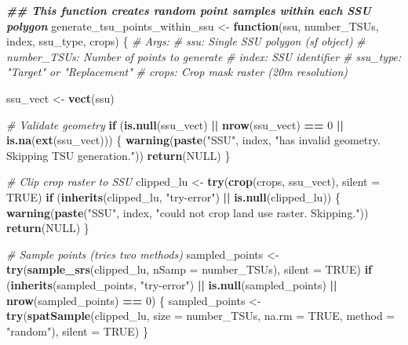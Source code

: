 \documentclass[
  10pt,
  b5paper,
  oneside]{book}
\newenvironment{Shaded}{\begin{snugshade}}{\end{snugshade}}
\newcommand{\AttributeTok}[1]{\textcolor[rgb]{0.13,0.29,0.53}{#1}}
\newcommand{\CommentTok}[1]{\textcolor[rgb]{0.56,0.35,0.01}{\textit{#1}}}
\newcommand{\ConstantTok}[1]{\textcolor[rgb]{0.56,0.35,0.01}{#1}}
\newcommand{\ControlFlowTok}[1]{\textcolor[rgb]{0.13,0.29,0.53}{\textbf{#1}}}
\newcommand{\DecValTok}[1]{\textcolor[rgb]{0.00,0.00,0.81}{#1}}
\newcommand{\DocumentationTok}[1]{\textcolor[rgb]{0.56,0.35,0.01}{\textbf{\textit{#1}}}}
\newcommand{\FunctionTok}[1]{\textcolor[rgb]{0.13,0.29,0.53}{\textbf{#1}}}
\newcommand{\NormalTok}[1]{#1}
\newcommand{\OtherTok}[1]{\textcolor[rgb]{0.56,0.35,0.01}{#1}}
\newcommand{\SpecialCharTok}[1]{\textcolor[rgb]{0.81,0.36,0.00}{\textbf{#1}}}
\newcommand{\StringTok}[1]{\textcolor[rgb]{0.31,0.60,0.02}{#1}}
\begin{document}
\begin{Shaded}
\begin{Highlighting}[]
\DocumentationTok{\#\# This function creates random point samples within each SSU polygon}
\NormalTok{generate\_tsu\_points\_within\_ssu }\OtherTok{\textless{}{-}} \ControlFlowTok{function}\NormalTok{(ssu, number\_TSUs, index, ssu\_type, crops) \{}
  \CommentTok{\# Args:}
  \CommentTok{\#   ssu: Single SSU polygon (sf object)}
  \CommentTok{\#   number\_TSUs: Number of points to generate}
  \CommentTok{\#   index: SSU identifier}
  \CommentTok{\#   ssu\_type: "Target" or "Replacement"}
  \CommentTok{\#   crops: Crop mask raster (20m resolution)}
  
\NormalTok{  ssu\_vect }\OtherTok{\textless{}{-}} \FunctionTok{vect}\NormalTok{(ssu)}
  
  \CommentTok{\# Validate geometry}
  \ControlFlowTok{if}\NormalTok{ (}\FunctionTok{is.null}\NormalTok{(ssu\_vect) }\SpecialCharTok{||} \FunctionTok{nrow}\NormalTok{(ssu\_vect) }\SpecialCharTok{==} \DecValTok{0} \SpecialCharTok{||} \FunctionTok{is.na}\NormalTok{(}\FunctionTok{ext}\NormalTok{(ssu\_vect))) \{}
    \FunctionTok{warning}\NormalTok{(}\FunctionTok{paste}\NormalTok{(}\StringTok{"SSU"}\NormalTok{, index, }\StringTok{"has invalid geometry. Skipping TSU generation."}\NormalTok{))}
    \FunctionTok{return}\NormalTok{(}\ConstantTok{NULL}\NormalTok{)}
\NormalTok{  \}}
  
  \CommentTok{\# Clip crop raster to SSU}
\NormalTok{  clipped\_lu }\OtherTok{\textless{}{-}} \FunctionTok{try}\NormalTok{(}\FunctionTok{crop}\NormalTok{(crops, ssu\_vect), }\AttributeTok{silent =} \ConstantTok{TRUE}\NormalTok{)}
  \ControlFlowTok{if}\NormalTok{ (}\FunctionTok{inherits}\NormalTok{(clipped\_lu, }\StringTok{"try{-}error"}\NormalTok{) }\SpecialCharTok{||} \FunctionTok{is.null}\NormalTok{(clipped\_lu)) \{}
    \FunctionTok{warning}\NormalTok{(}\FunctionTok{paste}\NormalTok{(}\StringTok{"SSU"}\NormalTok{, index, }\StringTok{"could not crop land use raster. Skipping."}\NormalTok{))}
    \FunctionTok{return}\NormalTok{(}\ConstantTok{NULL}\NormalTok{)}
\NormalTok{  \}}
  
  \CommentTok{\# Sample points (tries two methods)}
\NormalTok{  sampled\_points }\OtherTok{\textless{}{-}} \FunctionTok{try}\NormalTok{(}\FunctionTok{sample\_srs}\NormalTok{(clipped\_lu, }\AttributeTok{nSamp =}\NormalTok{ number\_TSUs), }\AttributeTok{silent =} \ConstantTok{TRUE}\NormalTok{)}
  \ControlFlowTok{if}\NormalTok{ (}\FunctionTok{inherits}\NormalTok{(sampled\_points, }\StringTok{"try{-}error"}\NormalTok{) }\SpecialCharTok{||} \FunctionTok{is.null}\NormalTok{(sampled\_points) }\SpecialCharTok{||} \FunctionTok{nrow}\NormalTok{(sampled\_points) }\SpecialCharTok{==} \DecValTok{0}\NormalTok{) \{}
\NormalTok{    sampled\_points }\OtherTok{\textless{}{-}} \FunctionTok{try}\NormalTok{(}\FunctionTok{spatSample}\NormalTok{(clipped\_lu, }\AttributeTok{size =}\NormalTok{ number\_TSUs, }\AttributeTok{na.rm =} \ConstantTok{TRUE}\NormalTok{, }\AttributeTok{method =} \StringTok{"random"}\NormalTok{), }\AttributeTok{silent =} \ConstantTok{TRUE}\NormalTok{)}
\NormalTok{  \}}
  

\end{Highlighting}
\end{Shaded}
\end{document}
